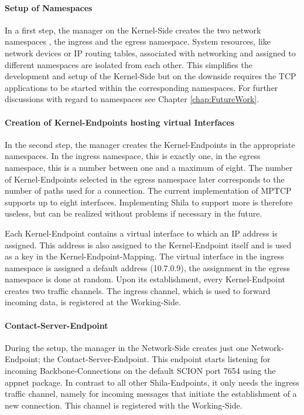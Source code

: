 \paragraph{Setup of Namespaces}

In a first step, the manager on the Kernel-Side creates the two network namespaces \cite{LinuxNetworkNamespacesUbuntuManual,LinuxNetworkNamespacesIntroduction}, the ingress and the egress namespace. System resources, like network devices or IP routing tables, associated with networking and assigned to different namespaces are isolated from each other. This simplifies the development and setup of the Kernel-Side but on the downside requires the TCP applications to be started within the corresponding namespaces. For further discussions with regard to namespaces see Chapter \ref{chap:FutureWork}.

\paragraph{Creation of Kernel-Endpoints hosting virtual Interfaces}

In the second step, the manager creates the Kernel-Endpoints in the appropriate namespaces. In the ingress namespace, this is exactly one, in the egress namespace, this is a number between one and a maximum of eight. The number of Kernel-Endpoints selected in the egress namespace later corresponds to the number of paths used for a connection. The current implementation of MPTCP supports up to eight interfaces. Implementing Shila to support more is therefore useless, but can be realized without problems if necessary in the future.

Each Kernel-Endpoint contains a virtual interface to which an IP address is assigned. This address is also assigned to the Kernel-Endpoint itself and is used as a key in the Kernel-Endpoint-Mapping. The virtual interface in the ingress namespace is assigned a default address ({\footnotesize 10.7.0.9}), the assignment in the egress namespace is done at random. Upon its establishment, every Kernel-Endpoint creates two traffic channels. The ingress channel, which is used to forward incoming data, is registered at the Working-Side. 

\paragraph{Contact-Server-Endpoint}

During the setup, the manager in the Network-Side creates just one Network-Endpoint; the Contact-Server-Endpoint. This endpoint starts listening for incoming Backbone-Connections on the default SCION port {\footnotesize 7654} using the appnet package. In contrast to all other Shila-Endpoints, it only needs the ingress traffic channel, namely for incoming messages that initiate the establishment of a new connection. This channel is registered with the Working-Side.

